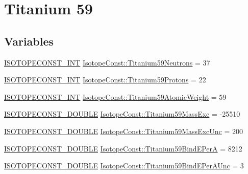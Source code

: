 \hypertarget{group___isotope_const-_titanium-_ti59}{}\section{Titanium 59}
\label{group___isotope_const-_titanium-_ti59}
\subsection*{Variables}
\begin{DoxyCompactItemize}
\item 
\mbox{\hyperlink{group___isotope_const-_macros_ga5f18360b3e99483a35c32d789e62621c}{I\+S\+O\+T\+O\+P\+E\+C\+O\+N\+S\+T\+\_\+\+I\+NT}} \mbox{\hyperlink{group___isotope_const-_titanium-_ti59_ga63250d05201d2e21548c73a73bf74653}{Isotope\+Const\+::\+Titanium59\+Neutrons}} = 37
\item 
\mbox{\hyperlink{group___isotope_const-_macros_ga5f18360b3e99483a35c32d789e62621c}{I\+S\+O\+T\+O\+P\+E\+C\+O\+N\+S\+T\+\_\+\+I\+NT}} \mbox{\hyperlink{group___isotope_const-_titanium-_ti59_ga57ae650f587e23c5ef64460f06971ac0}{Isotope\+Const\+::\+Titanium59\+Protons}} = 22
\item 
\mbox{\hyperlink{group___isotope_const-_macros_ga5f18360b3e99483a35c32d789e62621c}{I\+S\+O\+T\+O\+P\+E\+C\+O\+N\+S\+T\+\_\+\+I\+NT}} \mbox{\hyperlink{group___isotope_const-_titanium-_ti59_ga535e90eb52dc4344c9497e0dd226df7b}{Isotope\+Const\+::\+Titanium59\+Atomic\+Weight}} = 59
\item 
\mbox{\hyperlink{group___isotope_const-_macros_ga8f45a7272ce02c0b4c65c44636ed719a}{I\+S\+O\+T\+O\+P\+E\+C\+O\+N\+S\+T\+\_\+\+D\+O\+U\+B\+LE}} \mbox{\hyperlink{group___isotope_const-_titanium-_ti59_ga468e0ef0f43503ca2e44df49ca98ec9e}{Isotope\+Const\+::\+Titanium59\+Mass\+Exc}} = -\/25510
\item 
\mbox{\hyperlink{group___isotope_const-_macros_ga8f45a7272ce02c0b4c65c44636ed719a}{I\+S\+O\+T\+O\+P\+E\+C\+O\+N\+S\+T\+\_\+\+D\+O\+U\+B\+LE}} \mbox{\hyperlink{group___isotope_const-_titanium-_ti59_ga3a2e5b8eefce4d58547da1b321af5f33}{Isotope\+Const\+::\+Titanium59\+Mass\+Exc\+Unc}} = 200
\item 
\mbox{\hyperlink{group___isotope_const-_macros_ga8f45a7272ce02c0b4c65c44636ed719a}{I\+S\+O\+T\+O\+P\+E\+C\+O\+N\+S\+T\+\_\+\+D\+O\+U\+B\+LE}} \mbox{\hyperlink{group___isotope_const-_titanium-_ti59_gaff0e11d942a0a5db3641d631bf04eda0}{Isotope\+Const\+::\+Titanium59\+Bind\+E\+PerA}} = 8212
\item 
\mbox{\hyperlink{group___isotope_const-_macros_ga8f45a7272ce02c0b4c65c44636ed719a}{I\+S\+O\+T\+O\+P\+E\+C\+O\+N\+S\+T\+\_\+\+D\+O\+U\+B\+LE}} \mbox{\hyperlink{group___isotope_const-_titanium-_ti59_ga4db66fca81ea485730fe784165c7230b}{Isotope\+Const\+::\+Titanium59\+Bind\+E\+Per\+A\+Unc}} = 3

\end{DoxyCompactItemize}
